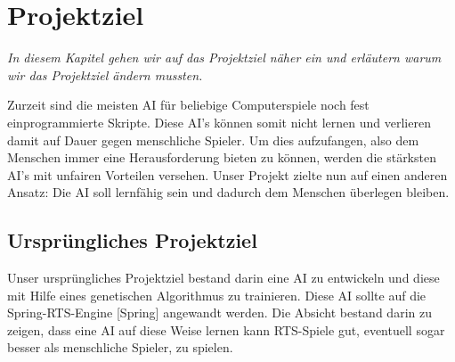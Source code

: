 \documentclass[
	12pt,
	a4paper,
	BCOR10mm,
	DIV14,
	headsepline,
	usegeometry,
]{scrreprt}
\begin{document}
\medskip


\chapter{Projektziel}
\label{Projektziel}

\textit{%
In diesem Kapitel gehen wir auf das Projektziel näher ein und erläutern warum wir das Projektziel ändern mussten.
}

\bigskip

Zurzeit sind die meisten AI für beliebige Computerspiele noch fest einprogrammierte Skripte. Diese AI's können somit nicht lernen und verlieren damit auf Dauer gegen menschliche Spieler. Um dies aufzufangen, also dem Menschen immer eine Herausforderung bieten zu können, werden die stärksten AI's mit unfairen Vorteilen versehen. Unser Projekt zielte nun auf einen anderen Ansatz: Die AI soll lernfähig sein und dadurch dem Menschen überlegen bleiben.

\section{Ursprüngliches Projektziel}

Unser ursprüngliches Projektziel bestand darin eine AI zu entwickeln und diese mit Hilfe eines genetischen Algorithmus zu trainieren. Diese AI sollte auf die Spring-RTS-Engine [Spring] angewandt werden. Die Absicht bestand darin zu zeigen, dass eine AI auf diese Weise lernen kann RTS-Spiele gut, eventuell sogar besser als menschliche Spieler, zu spielen.\\
\end{document}

